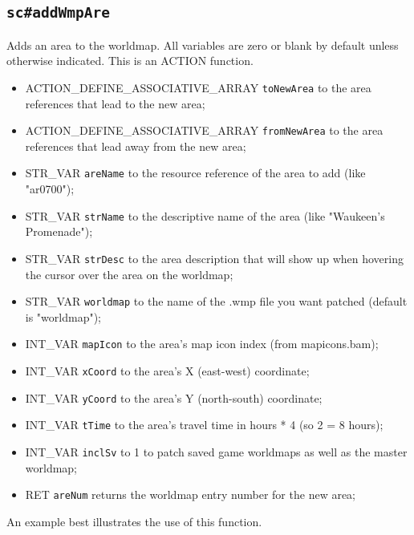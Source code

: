 \documentclass{article}
\def\DEFINE#1{{\tt \bf #1}\label{#1}\index{#1}}
\begin{document}
\subsection{\DEFINE{sc\#addWmpAre}}
Adds an area to the worldmap. All variables are zero or blank by default unless otherwise indicated.
This is an ACTION function.

\begin{itemize}
\item ACTION_DEFINE_ASSOCIATIVE_ARRAY \verb+toNewArea+ to the area references that lead to the new area;
\item ACTION_DEFINE_ASSOCIATIVE_ARRAY \verb+fromNewArea+ to the area references that lead away from the new area;
\item STR_VAR \verb+areName+ to the resource reference of the area to add (like "ar0700");
\item STR_VAR \verb+strName+ to the descriptive name of the area (like "Waukeen's Promenade");
\item STR_VAR \verb+strDesc+ to the area description that will show up when hovering the cursor over the area on the worldmap;
\item STR_VAR \verb+worldmap+ to the name of the .wmp file you want patched (default is "worldmap");
\item INT_VAR \verb+mapIcon+ to the area's map icon index (from mapicons.bam);
\item INT_VAR \verb+xCoord+ to the area's X (east-west) coordinate;
\item INT_VAR \verb+yCoord+ to the area's Y (north-south) coordinate;
\item INT_VAR \verb+tTime+ to the area's travel time in hours * 4 (so 2 = 8 hours);
\item INT_VAR \verb+inclSv+ to 1 to patch saved game worldmaps as well as the master worldmap;
\item RET \verb+areNum+ returns the worldmap entry number for the new area;
\end{itemize}
An example best illustrates the use of this function.
\end{document}
